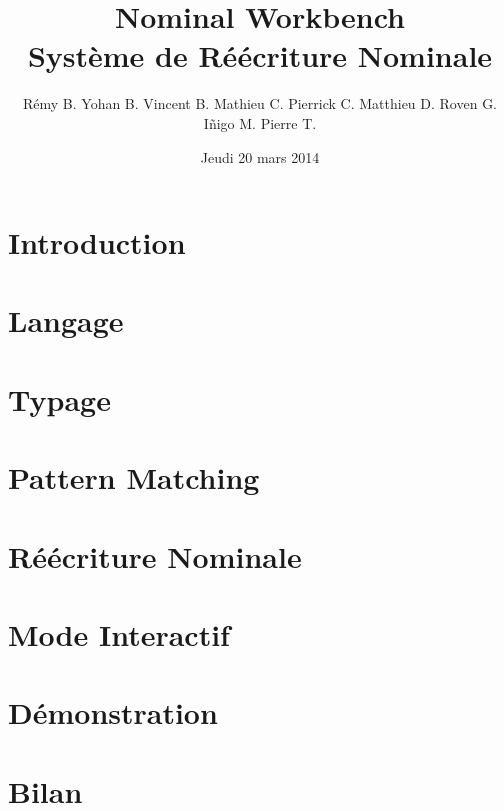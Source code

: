 \documentclass[xcolor=dvipsnames]{beamer}
\title[Nominal Workbench]{Nominal Workbench\\Système de Réécriture Nominale}
\author[\'Equipe NoWork]{Rémy B. Yohan B. Vincent B. Mathieu C. Pierrick C. Matthieu D. Roven G. I\~nigo M. Pierre T.}
\institute[UPMC]{Université Pierre et Marie Curie}
\date{Jeudi 20 mars 2014}
\begin{document}
\begin{frame}
\titlepage
\end{frame}


\section{Introduction}


\section{Langage}


\section{Typage}


\section{Pattern Matching}


\section{Réécriture Nominale}


\section{Mode Interactif}


\section{Démonstration}




\section{Bilan}

\end{document}
